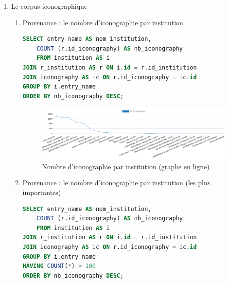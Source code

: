 \begin{enumerate}
    \item Le corpus iconographique
    \begin{enumerate}
        \item Provenance : le nombre d'iconographie par institution
            \begin{lstlisting}[language=SQL, caption=Nombre d'iconographies par institution]
SELECT entry_name AS nom_institution,
    COUNT (r.id_iconography) AS nb_iconography 
    FROM institution AS i 
JOIN r_institution AS r ON i.id = r.id_institution 
JOIN iconography AS ic ON r.id_iconography = ic.id 
GROUP BY i.entry_name 
ORDER BY nb_iconography DESC;\end{lstlisting}
            
            \begin{figure}[ht!]
                \centering
                \includegraphics[width=1\linewidth]{images/graphiques/nb_icono_institution_barChart.png}
                \caption{Nombre d'iconographie par institution (graphe en ligne)}
                \label{fig:nb_icono_institution}
            \end{figure}
            
\newpage    

        \item Provenance : le nombre d'iconographie par institution (les plus importantes)
            \begin{lstlisting}[language=SQL, caption=Nombre d'iconographies par institution Top 7]
SELECT entry_name AS nom_institution,
    COUNT (r.id_iconography) AS nb_iconography 
    FROM institution AS i 
JOIN r_institution AS r ON i.id = r.id_institution 
JOIN iconography AS ic ON r.id_iconography = ic.id 
GROUP BY i.entry_name 
HAVING COUNT(*) > 100
ORDER BY nb_iconography DESC; \end{lstlisting}
            

\end{enumerate}
\end{enumerate}
